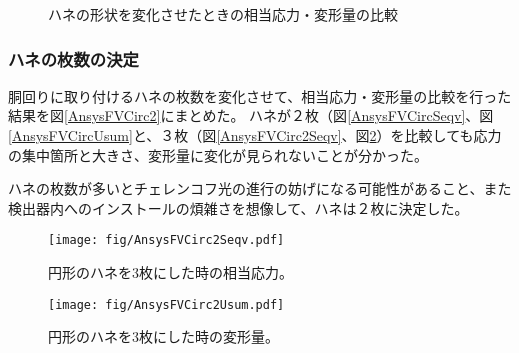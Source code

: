 \documentclass[11pt]{jreport}
\newcommand{\figref}[1]{図\ref{#1}}
\begin{document}
\begin{figure}[htbp]
  \begin{minipage}{0.47\textwidth}
  \end{minipage}
  \hfill
  \begin{minipage}{0.47\textwidth}
  \end{minipage}
  \hfill
  \begin{minipage}{0.47\textwidth}
  \end{minipage}
  \hfill \begin{minipage}{0.47\textwidth}
  \end{minipage}
    \caption{ハネの形状を変化させたときの相当応力・変形量の比較}
  \label{AnsysFVSqCirc}
\end{figure}

\subsubsection{ハネの枚数の決定}
胴回りに取り付けるハネの枚数を変化させて、相当応力・変形量の比較を行った結果を\figref{AnsysFVCirc2}にまとめた。
ハネが２枚（\figref{AnsysFVCircSeqv}、\figref{AnsysFVCircUsum}と、３枚（\figref{AnsysFVCirc2Seqv}、\figref{AnsysFVCirc2Usum}）を比較しても応力の集中箇所と大きさ、変形量に変化が見られないことが分かった。

ハネの枚数が多いとチェレンコフ光の進行の妨げになる可能性があること、また検出器内へのインストールの煩雑さを想像して、ハネは２枚に決定した。

\begin{figure}[htbp]
\begin{minipage}{0.47\textwidth}
\centering
\texttt{[image: fig/AnsysFVCirc2Seqv.pdf]}
\caption[円形のハネを3枚にした時の相当応力]{円形のハネを3枚にした時の相当応力。}
\label{AnsysFVCirc2Seqv}
\end{minipage}
\hfill
\begin{minipage}{0.47\textwidth}
\centering
\texttt{[image: fig/AnsysFVCirc2Usum.pdf]}
\caption[円形のハネを3枚にした時の変形量]{円形のハネを3枚にした時の変形量。}
\label{AnsysFVCirc2Usum}
\end{minipage}
\end{figure}
\fi%
\end{document}
